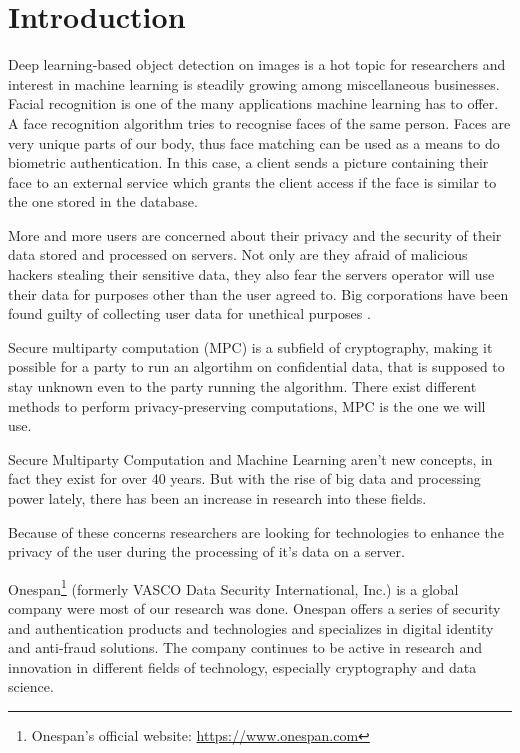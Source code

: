 
\chapter{Introduction}
Deep learning-based object detection on images is a hot topic for researchers and interest in machine learning is steadily growing among miscellaneous businesses. Facial recognition is one of the many applications machine learning has to offer. A face recognition algorithm tries to recognise faces of the same person. Faces are very unique parts of our body, thus face matching can be used as a means to do biometric authentication. In this case, a client sends a picture containing their face to an external service which grants the client access if the face is similar to the one stored in the database.

More and more users are concerned about their privacy and the security of their data stored and processed on servers. Not only are they afraid of malicious hackers stealing their sensitive data, they also fear the servers operator will use their data for purposes other than the user agreed to. Big corporations have been found guilty of collecting user data for unethical purposes \cite{cadwalladr2018revealed}.

Secure multiparty computation (MPC) is a subfield of cryptography, making it possible for a party to run an algortihm on confidential data, that is supposed to stay unknown even to the party running the algorithm. There exist different methods to perform privacy-preserving computations, MPC is the one we will use.

Secure Multiparty Computation and Machine Learning aren't new concepts, in fact they exist for over 40 years. But with the rise of big data and processing power lately, there has been an increase in research into these fields.

Because of these concerns researchers are looking for technologies to enhance the privacy of the user during the processing of it's data on a server.

Onespan\footnote{Onespan's official website: \url{https://www.onespan.com}} (formerly VASCO Data Security International, Inc.) is a global company were most of our research was done. Onespan offers a series of security and authentication products and technologies and specializes in digital identity and anti-fraud solutions. The company continues to be active in research and innovation in different fields of technology, especially cryptography and data science.

